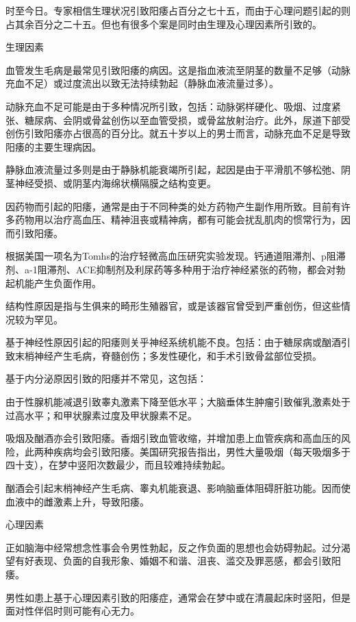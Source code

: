 \documentclass[12pt,UTF8]{ctexbook}
\begin{document}
时至今日。专家相信生理状况引致阳痿占百分之七十五，而由于心理问题引起的则占其余百分之二十五。但也有很多个案是同时由生理及心理因素所引致的。

生理因素

血管发生毛病是最常见引致阳痿的病因。这是指血液流至阴茎的数量不足够（动脉充血不足）或过度流出以致无法持续勃起（静脉血液流量过多）。

动脉充血不足可能是由于多种情况所引致，包括：动脉粥样硬化、吸烟、过度紧张、糖尿病、会阴或骨盆创伤以至血管受损，或骨盆放射治疗。此外，尿道下部受创伤引致阳痿亦占很高的百分比。就五十岁以上的男士而言，动脉充血不足是导致阳痿的主要生理病因。

静脉血液流量过多则是由于静脉机能衰竭所引起，起因是由于平滑肌不够松弛、阴茎神经受损、或阴茎内海绵状横隔膜之结构变更。

因药物而引起的阳痿，通常是由于不同种类的处方药物产生副作用所致。目前有许多药物用以治疗高血压、精神沮丧或精神病，都有可能会扰乱肌肉的惯常行为，因而引致阳痿。

根据美国一项名为Tomhs的治疗轻微高血压研究实验发现。钙通道阻滞剂、p阻滞剂、a-1阻滞剂、ACE抑制剂及利尿药等多种用于治疗神经紧张的药物，都会对勃起机能产生负面作用。

结构性原因是指与生俱来的畸形生殖器官，或是该器官曾受到严重创伤，但这些情况较为罕见。

基于神经性原因引起的阳痿则关乎神经系统机能不良。包括：由于糖尿病或酗酒引致末梢神经产生毛病，脊髓创伤；多发性硬化，和手术引致骨盆部位受损。

基于内分泌原因引致的阳痿并不常见，这包括：

由于性腺机能减退引致睾丸激素下降至低水平；大脑垂体生肿瘤引致催乳激素处于过高水平；和甲状腺素过度及甲状腺素不足。

吸烟及酗酒亦会引致阳痿。香烟引致血管收缩，并增加患上血管疾病和高血压的风险，此两种疾病均会引致阳痿。美国研究报告指出，男性大量吸烟（每天吸烟多于四十支），在梦中竖阳次数最少，而且较难持续勃起。

酗酒会引起末梢神经产生毛病、睾丸机能衰退、影响脑垂体阻碍肝脏功能。因而使血液中的雌激素上升，导致阳痿。

心理因素

正如脑海中经常想念性事会令男性勃起，反之作负面的思想也会妨碍勃起。过分渴望有好表现、负面的自我形象、婚姻不和谐、沮丧、滥交及罪恶感，都会引致阳痿。

男性如患上基于心理因素引致的阳痿症，通常会在梦中或在清晨起床时竖阳，但是面对性伴侣时则可能有心无力。
\end{document}
